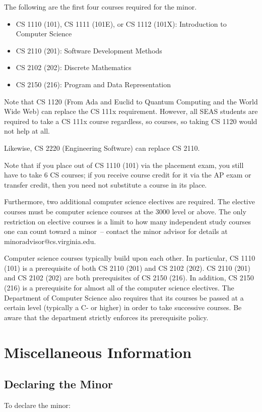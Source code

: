 \documentclass[10pt,letter]{book}
\makeatletter
\newenvironment{itemlist}{
\begin{itemize}
\setlength{\itemsep}{0pt}
\setlength{\parskip}{0pt}}
{\end{itemize}}
\newcommand{\csminoradvisoremail}{minoradvisor@cs.virginia.edu}
\newcommand{\mysection}[1]{\section{#1}\renewcommand{\rightmark}{#1}}
\makeatother
\begin{document}
The following are the first four courses required for the minor.

\begin{itemlist} 
\item CS 1110 (101), CS 1111 (101E), or CS 1112 (101X): Introduction
  to Computer Science
\item CS 2110 (201): Software Development Methods
\item CS 2102 (202): Discrete Mathematics
\item CS 2150 (216): Program and Data Representation
\end{itemlist}

Note that CS 1120 (From Ada and Euclid to Quantum Computing and the
World Wide Web) can replace the CS 111x requirement.  However, all
SEAS students are required to take a CS 111x course regardless, so
courses, so taking CS 1120 would not help at all.

Likewise, CS 2220 (Engineering Software) can replace CS 2110.

Note that if you place out of CS 1110 (101) via the placement exam,
you still have to take 6 CS courses; if you receive course credit for
it via the AP exam or transfer credit, then you need not substitute a
course in its place.

Furthermore, two additional computer science electives are
required. The elective courses must be computer science courses at the
3000 level or above. The only restriction on elective courses is a
limit to how many independent study courses one can count toward a
minor~-- contact the minor advisor for details at
\csminoradvisoremail.

Computer science courses typically build upon each other. In
particular, CS 1110 (101) is a prerequisite of both CS 2110 (201) and
CS 2102 (202). CS 2110 (201) and CS 2102 (202) are both prerequisites
of CS 2150 (216). In addition, CS 2150 (216) is a prerequisite for
almost all of the computer science electives. The Department of
Computer Science also requires that its courses be passed at a certain
level (typically a C- or higher) in order to take successive
courses. Be aware that the department strictly enforces its
prerequisite policy.

 
\mysection{Miscellaneous Information}
\subsection{Declaring the Minor}

To declare the minor:
\end{document}
